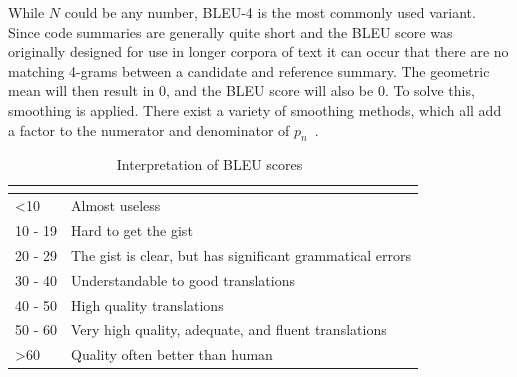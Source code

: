 While \(N\) could be any number, BLEU-4 is the most commonly used variant. Since code summaries are generally quite short and the BLEU score was originally designed for use in longer corpora of text it can occur that there are no matching 4-grams between a candidate and reference summary\cite{evaluationSummarization}. The geometric mean will then result in 0, and the BLEU score will also be 0. To solve this, smoothing is applied. There exist a variety of smoothing methods, which all add a factor to the numerator and denominator of \(p_n\)~\cite{evaluationSummarization}.

\begin{table}[H]
\begin{tabular}{l|l}
\hline
\rowcolor[HTML]{E8EAED} 
\multicolumn{1}{|l|}{\cellcolor[HTML]{E8EAED}{\color[HTML]{202124} \textbf{BLEU Score}}} & \multicolumn{1}{l|}{\cellcolor[HTML]{E8EAED}{\color[HTML]{202124} Interpretation}} \\ \hline
\rowcolor[HTML]{FFFFFF} 
{\color[HTML]{202124} \textless 10}                                                      & {\color[HTML]{202124} Almost useless}                                              \\
\rowcolor[HTML]{FFFFFF} 
{\color[HTML]{202124} 10 - 19}                                                           & {\color[HTML]{202124} Hard to get the gist}                                        \\
\rowcolor[HTML]{FFFFFF} 
{\color[HTML]{202124} 20 - 29}                                                           & {\color[HTML]{202124} The gist is clear, but has significant grammatical errors}   \\
\rowcolor[HTML]{FFFFFF} 
{\color[HTML]{202124} 30 - 40}                                                           & {\color[HTML]{202124} Understandable to good translations}                         \\
\rowcolor[HTML]{FFFFFF} 
{\color[HTML]{202124} 40 - 50}                                                           & {\color[HTML]{202124} High quality translations}                                   \\
\rowcolor[HTML]{FFFFFF} 
{\color[HTML]{202124} 50 - 60}                                                           & {\color[HTML]{202124} Very high quality, adequate, and fluent translations}        \\
\rowcolor[HTML]{FFFFFF} 
{\color[HTML]{202124} \textgreater 60}                                                   & {\color[HTML]{202124} Quality often better than human}
\end{tabular}
\caption{Interpretation of BLEU scores~\cite{evaluationSummarization}}
\label{tab:BLEUScale}
\end{table}

